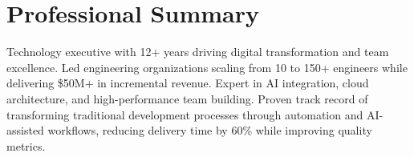 
\section{Professional Summary}
\small{
  Technology executive with 12+ years driving digital transformation and team excellence. Led engineering organizations scaling from 10 to 150+ engineers while delivering \$50M+ in incremental revenue. Expert in AI integration, cloud architecture, and high-performance team building. Proven track record of transforming traditional development processes through automation and AI-assisted workflows, reducing delivery time by 60\% while improving quality metrics.
}